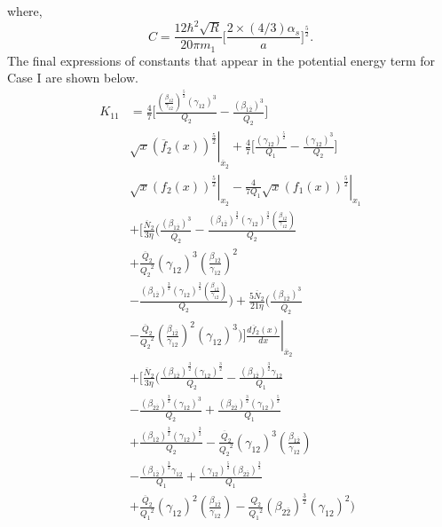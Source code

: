 \documentclass[final,3p,times,twocolumn]{elsarticle}
\begin{document}
            where,
         \begin{equation}
            C = \frac{12\hbar^2\sqrt{R}}{20 \pi m_1}\biggl[\frac{2\times(4/3)\alpha_s}{a}\biggr]^\frac{5}{2}.
            \label{eqn:expression_of_C}
        \end{equation}    
            The final expressions of constants that appear in the potential energy term for Case I are shown below. \\ 
       
            \begin{equation*}
               \begin{split}
              K_{11} & = \frac{4}{7} \biggl[ \frac{ \left(\frac{\beta_{1\overline{2}}}{\gamma_{12}}\right)^\frac{5}{2} (\gamma_{12})^3}{Q_2} -  \frac{(\beta_{1\overline{2}})^3}{\overline{Q}_{2}} \biggr] \\ & \sqrt{x} \left. (\overline{f}_{2}(x))^\frac{5}{2} \right|_{\overline{x}_{2}}  +  \frac{4}{7} \biggl[\frac{(\gamma_{12})^\frac{5}{2}}{Q_1} - \frac{(\gamma_{12})^3}{Q_2} \biggr] \\ & \left. \sqrt{x} (f_2(x))^\frac{5}{2} \right|_{x_2}   -\left. \frac{4}{7 Q_1} \sqrt{x} (f_1(x))^\frac{5}{2} \right|_{x_1}  \\ & + \Biggl[ \frac{\overline{N}_{2}}{3 \eta} \Biggl( \frac{(\beta_{1\overline{2}})^3}{\overline{Q}_{2}}  - \frac{(\beta_{1\overline{2}})^\frac{3}{2} (\gamma_{12})^\frac{3}{2}  \left(\frac{\beta_{1\overline{2}}}{\gamma_{12}}\right)}{Q_2}  \\ & + \frac{\overline{Q}_{2}}{{Q_2}^2} (\gamma_{12})^3  \left(\frac{\beta_{1\overline{2}}}{\gamma_{12}}\right)^2 \\ & - \frac{(\beta_{1\overline{2}})^\frac{3}{2} (\gamma_{12})^\frac{3}{2}  \left(\frac{\beta_{1\overline{2}}}{\gamma_{12}}\right)}{Q_2} \Biggr) + \frac{5 \overline{N}_{2}}{21 \eta} \Biggl( \frac{(\beta_{1\overline{2}})^3}{\overline{Q}_{2}}  \\ &  - \left. \frac{\overline{Q}_{2}}{{Q_2}^2}  \left(\frac{\beta_{1\overline{2}}}{\gamma_{12}}\right)^2 (\gamma_{12})^3 \Biggr) \Biggr] \frac{d\overline{f}_{2}(x)}{dx} \right|_{\overline{x}_{2}}  \\ & + \Biggl[ \frac{\overline{N}_{2}}{3 \eta}  \Biggl( \frac{(\beta_{1\overline{2}})^\frac{3}{2} (\gamma_{12})^\frac{3}{2}}{Q_2}  - \frac{(\beta_{1\overline{2}})^\frac{3}{2} \gamma_{12}}{Q_1} \\ & - \frac{(\beta_{2\overline{2}})^\frac{3}{2}(\gamma_{12})^3}{Q_2} + \frac{(\beta_{2\overline{2}})^\frac{3}{2} (\gamma_{12})^\frac{5}{2}}{Q_1}  \\ & + \frac{(\beta_{1\overline{2}})^\frac{3}{2} (\gamma_{12})^\frac{3}{2}}{Q_2}  - \frac{\overline{Q}_{2}}{{Q_2}^2} (\gamma_{12})^3  \left(\frac{\beta_{1\overline{2}}}{\gamma_{12}}\right) \\ &- \frac{(\beta_{1\overline{2}})^\frac{3}{2} \gamma_{12}}{Q_1}  + \frac{(\gamma_{12})^\frac{5}{2} (\beta_{2\overline{2}})^\frac{3}{2}}{Q_1} \\ & + \frac{\overline{Q}_{2}}{{Q_1}^2} (\gamma_{12})^2  \left(\frac{\beta_{1\overline{2}}}{\gamma_{12}}\right)  - \frac{Q_2}{{Q_1}^2} (\beta_{2\overline{2}})^\frac{3}{2} (\gamma_{12})^2 \Biggr)  \\ & 
\end{split}
\end{equation*}
\end{document}
